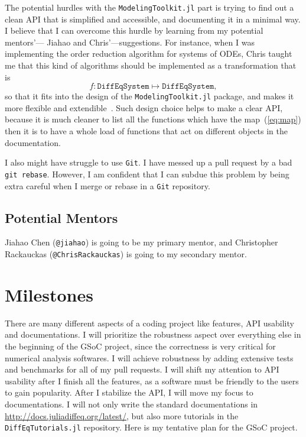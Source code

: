 \documentclass[12pt,a4paper]{article}
\begin{document}

The potential hurdles with the \texttt{ModelingToolkit.jl} part is trying to
find out a clean API that is simplified and accessible, and documenting it in a
minimal way. I believe that I can overcome this hurdle by learning from my
potential mentors'--- Jiahao and Chris'---suggestions. For instance, when I was
implementing the order reduction algorithm for systems of ODEs, Chris taught me
that this kind of algorithms should be implemented as a transformation that is
\begin{equation}\label{eq:map}
  f: \texttt{DiffEqSystem}\mapsto \texttt{DiffEqSystem},
\end{equation}
so that it fits into the design of the \texttt{ModelingToolkit.jl} package, and
makes it more flexible and extendible~\cite{i49}. Such design choice helps to
make a clear API, because it is much cleaner to list all the functions which have
the map~(\ref{eq:map}) then it is to have a whole load of functions that act on
different objects in the documentation.

I also might have struggle to use \texttt{Git}. I have messed up a pull request
by a bad \texttt{git rebase}. However, I am confident that I can subdue this
problem by being extra careful when I merge or rebase in a \texttt{Git}
repository.

\subsection{Potential Mentors}
Jiahao Chen (\texttt{@jiahao}) is going to be my primary mentor, and
Christopher Rackauckas (\texttt{@ChrisRackauckas}) is going to my secondary
mentor.

\section{Milestones}
There are many different aspects of a coding project like features, API
usability and documentations. I will prioritize the robustness aspect over
everything else in the beginning of the GSoC project, since the correctness is
very critical for numerical analysis softwares. I will achieve robustness by
adding extensive tests and benchmarks for all of my pull requests. I will shift
my attention to API usability after I finish all the features, as a software
must be friendly to the users to gain popularity. After I stabilize the API, I
will move my focus to documentations. I will not only write the standard
documentations in \url{http://docs.juliadiffeq.org/latest/}, but also more
tutorials in the \texttt{DiffEqTutorials.jl} repository. Here is my tentative
plan for the GSoC project.
\end{document}
